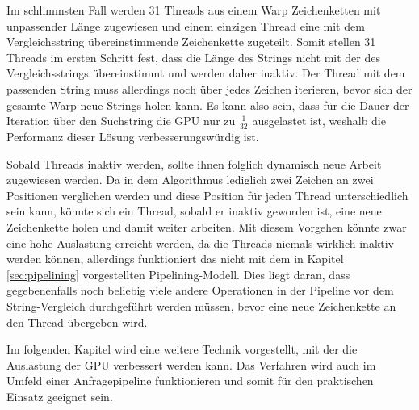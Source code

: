 Im schlimmsten Fall werden 31 Threads aus einem Warp Zeichenketten mit unpassender Länge zugewiesen und einem einzigen Thread eine mit dem Vergleichsstring übereinstimmende Zeichenkette zugeteilt.
Somit stellen 31 Threads im ersten Schritt fest, dass die Länge des Strings nicht mit der des Vergleichsstrings übereinstimmt und werden daher inaktiv.
Der Thread mit dem passenden String muss allerdings noch über jedes Zeichen iterieren, bevor sich der gesamte Warp neue Strings holen kann.
Es kann also sein, dass für die Dauer der Iteration über den Suchstring die GPU nur zu $\frac{1}{32}$ ausgelastet ist, weshalb die Performanz dieser Lösung verbesserungswürdig ist.

Sobald Threads inaktiv werden, sollte ihnen folglich dynamisch neue Arbeit zugewiesen werden.
Da in dem Algorithmus lediglich zwei Zeichen an zwei Positionen verglichen werden und diese Position für jeden Thread unterschiedlich sein kann, könnte sich ein Thread, sobald er inaktiv geworden ist, eine neue Zeichenkette holen und damit weiter arbeiten.
Mit diesem Vorgehen könnte zwar eine hohe Auslastung erreicht werden, da die Threads niemals wirklich inaktiv werden können, allerdings funktioniert das nicht mit dem in Kapitel \ref{sec:pipelining} vorgestellten Pipelining-Modell.
Dies liegt daran, dass gegebenenfalls noch beliebig viele andere Operationen in der Pipeline vor dem String-Vergleich durchgeführt werden müssen, bevor eine neue Zeichenkette an den Thread übergeben wird.

Im folgenden Kapitel wird eine weitere Technik vorgestellt, mit der die Auslastung der GPU verbessert werden kann.
Das Verfahren wird auch im Umfeld einer Anfragepipeline funktionieren und somit für den praktischen Einsatz geeignet sein.
